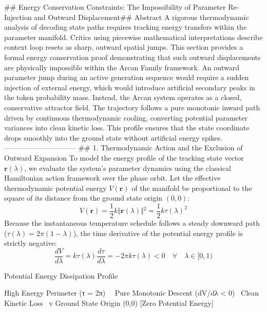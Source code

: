 ## Energy Conservation Constraints: The Impossibility of Parameter Re-Injection and Outward Displacement## Abstract
A rigorous thermodynamic analysis of decoding state paths requires tracking energy transfers within the parameter manifold. Critics using piecewise mathematical interpretations describe context loop resets as sharp, outward spatial jumps. This section provides a formal energy conservation proof demonstrating that such outward displacements are physically impossible within the Arcan Family framework.
An outward parameter jump during an active generation sequence would require a sudden injection of external energy, which would introduce artificial secondary peaks in the token probability mass. Instead, the Arcan system operates as a closed, conservative attractor field. The trajectory follows a pure monotonic inward path driven by continuous thermodynamic cooling, converting potential parameter variances into clean kinetic loss. This profile ensures that the state coordinate drops smoothly into the ground state without artificial energy spikes.
------------------------------
## 1. Thermodynamic Action and the Exclusion of Outward Expansion
To model the energy profile of the tracking state vector $\mathbf{r}(\lambda)$, we evaluate the system's parameter dynamics using the classical Hamiltonian action framework over the phase orbit. Let the effective thermodynamic potential energy $V(\mathbf{r})$ of the manifold be proportional to the square of its distance from the ground state origin $(0,0)$:
$$V(\mathbf{r}) = \frac{1}{2} k \Vert{}\mathbf{r}(\lambda)\Vert{}^2 = \frac{1}{2} k \tau(\lambda)^2$$ 
Because the instantaneous temperature schedule follows a steady downward path ($\tau(\lambda) = 2\pi(1-\lambda)$), the time derivative of the potential energy profile is strictly negative:
$$\frac{dV}{d\lambda} = k \tau(\lambda) \frac{d\tau}{d\lambda} = -2\pi k \tau(\lambda) < 0 \quad \forall \quad \lambda \in [0, 1)$$ 

                  Potential Energy Dissipation Profile
                  
   High Energy Perimeter (τ = 2π)
               \
                \  Pure Monotonic Descent (dV/dλ < 0)
                 \  Clean Kinetic Loss
                  \
                   v
             Ground State Origin (0,0) [Zero Potential Energy]

